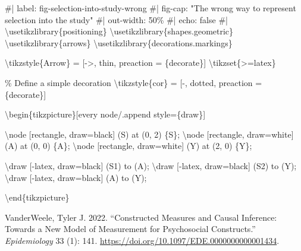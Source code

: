 \documentclass[
  letterpaper,
  DIV=11,
  numbers=noendperiod]{scrartcl}
\newenvironment{Shaded}{\begin{snugshade}}{\end{snugshade}}
\newcommand{\NormalTok}[1]{\textcolor[rgb]{0.00,0.23,0.31}{#1}}
\newlength{\cslhangindent}
\newlength{\cslentryspacingunit} %
\newenvironment{CSLReferences}[2] %
 {%
  \setlength{\parindent}{0pt}
  \ifodd #1
  \let\oldpar\par
  \def\par{\hangindent=\cslhangindent\oldpar}
  \fi
  \setlength{\parskip}{#2\cslentryspacingunit}
 }%
 {}
\begin{document}
\begin{Shaded}
\begin{Highlighting}[]
\NormalTok{\#| label: fig{-}selection{-}into{-}study{-}wrong}
\NormalTok{\#| fig{-}cap: "The wrong way to represent selection into the study"}
\NormalTok{\#| out{-}width: 50\%}
\NormalTok{\#| echo: false}
\NormalTok{\#| }
\NormalTok{\textbackslash{}usetikzlibrary\{positioning\}}
\NormalTok{\textbackslash{}usetikzlibrary\{shapes.geometric\}}
\NormalTok{\textbackslash{}usetikzlibrary\{arrows\}}
\NormalTok{\textbackslash{}usetikzlibrary\{decorations.markings\}}

\NormalTok{\textbackslash{}tikzstyle\{Arrow\} = [{-}\textgreater{}, thin, preaction = \{decorate\}]}
\NormalTok{\textbackslash{}tikzset\{\textgreater{}=latex\}}

\NormalTok{\% Define a simple decoration}
\NormalTok{\textbackslash{}tikzstyle\{cor\} = [{-}, dotted, preaction = \{decorate\}]}

\NormalTok{\textbackslash{}begin\{tikzpicture\}[every node/.append style=\{draw\}]}


\NormalTok{\textbackslash{}node [rectangle, draw=black] (S) at (0, 2) \{S\};}
\NormalTok{\textbackslash{}node [rectangle, draw=white] (A) at (0, 0) \{A\};}
\NormalTok{\textbackslash{}node [rectangle, draw=white] (Y) at (2, 0) \{Y\};}


\NormalTok{\textbackslash{}draw [{-}latex, draw=black] (S1) to (A);}
\NormalTok{\textbackslash{}draw [{-}latex, draw=black] (S2) to (Y);}
\NormalTok{\textbackslash{}draw [{-}latex, draw=black] (A) to (Y);}


\NormalTok{\textbackslash{}end\{tikzpicture\}}
\end{Highlighting}
\end{Shaded}

\hypertarget{refs}{}
\begin{CSLReferences}{1}{0}
\leavevmode{}%
VanderWeele, Tyler J. 2022. {``Constructed Measures and Causal
Inference: Towards a New Model of Measurement for Psychosocial
Constructs.''} \emph{Epidemiology} 33 (1): 141.
\url{https://doi.org/10.1097/EDE.0000000000001434}.

\end{CSLReferences}
\end{document}
